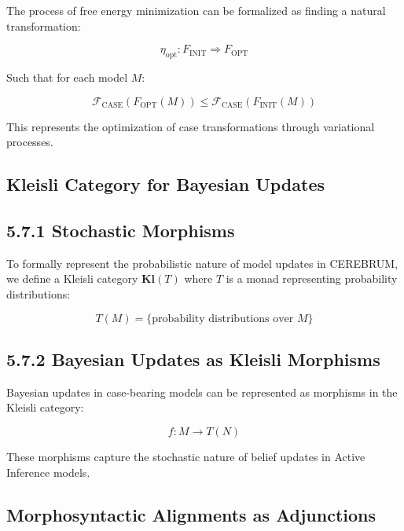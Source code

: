 \documentclass[
  11pt,
  letterpaper,
]{article}
\begin{document}
The process of free energy minimization can be formalized as finding a
natural transformation:

\[\eta_{\text{opt}}: F_{\text{INIT}} \Rightarrow F_{\text{OPT}}\]

Such that for each model \(M\):

\[\mathcal{F}_{\text{CASE}}(F_{\text{OPT}}(M)) \leq \mathcal{F}_{\text{CASE}}(F_{\text{INIT}}(M))\]

This represents the optimization of case transformations through
variational processes.

\hypertarget{kleisli-category-for-bayesian-updates}{%
\subsection{Kleisli Category for Bayesian
Updates}\label{kleisli-category-for-bayesian-updates}}

\hypertarget{stochastic-morphisms}{%
\subsection{5.7.1 Stochastic Morphisms}\label{stochastic-morphisms}}

To formally represent the probabilistic nature of model updates in
CEREBRUM, we define a Kleisli category \(\mathbf{Kl}(T)\) where \(T\) is
a monad representing probability distributions:

\[T(M) = \{\text{probability distributions over } M\}\]

\hypertarget{bayesian-updates-as-kleisli-morphisms}{%
\subsection{5.7.2 Bayesian Updates as Kleisli
Morphisms}\label{bayesian-updates-as-kleisli-morphisms}}

Bayesian updates in case-bearing models can be represented as morphisms
in the Kleisli category:

\[f: M \rightarrow T(N)\]

These morphisms capture the stochastic nature of belief updates in
Active Inference models.

\hypertarget{morphosyntactic-alignments-as-adjunctions}{%
\subsection{Morphosyntactic Alignments as
Adjunctions}\label{morphosyntactic-alignments-as-adjunctions}}
\end{document}

